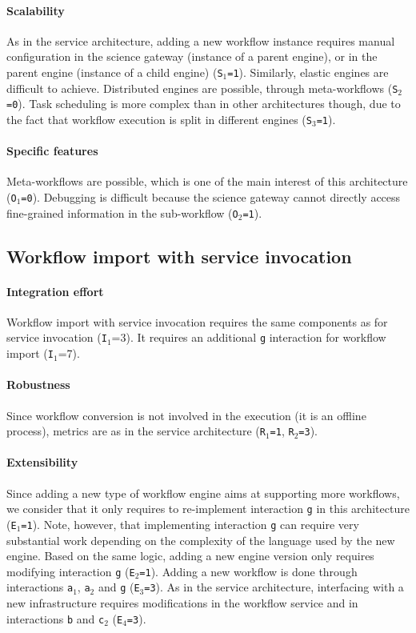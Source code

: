 \documentclass[preprint,3p,twocolumn]{elsarticle}
\begin{document}
\paragraph{Scalability} As in the service architecture, adding a new
workflow instance requires manual configuration in the science gateway
(instance of a parent engine), or in the parent engine (instance of a
child engine) (\texttt{S$_1$=1}). Similarly, elastic engines are
difficult to achieve. Distributed engines are
possible, through meta-workflows (\texttt{S$_2$=0}). Task scheduling
is more complex than in other architectures though, due to the fact
that workflow execution is split in different engines (\texttt{S$_3$=1}).

\paragraph{Specific features}
Meta-workflows are possible, which is one of the main interest of this
architecture (\texttt{O$_1$=0}).  Debugging is difficult because the
science gateway cannot directly access fine-grained information in the
sub-workflow (\texttt{O$_2$=1}).

\subsection{Workflow import with service invocation}

\paragraph{Integration effort} Workflow import with service invocation
requires the same components as for service invocation
(\texttt{I$_1$}=3). It requires an additional \texttt{g} interaction
for workflow import (\texttt{I$_1$}=7).

\paragraph{Robustness} Since workflow conversion is not involved in
the execution (it is an offline process), metrics are as in the
service architecture (\texttt{R$_1$=1}, \texttt{R$_2$=3}).

\paragraph{Extensibility} Since adding a new type of workflow engine
aims at supporting more workflows, we consider that it only requires
to re-implement interaction \texttt{g} in this architecture  (\texttt{E$_1$=1}). Note,
however, that implementing interaction \texttt{g} can require very
substantial work depending on the complexity of the language used by
the new engine. Based on the same logic, adding a
new engine version only requires modifying interaction \texttt{g}
(\texttt{E$_2$=1}).  Adding a new workflow is done through
interactions \texttt{a$_1$}, \texttt{a$_2$} and \texttt{g} (\texttt{E$_3$=3}). As in the
service architecture, interfacing with a new infrastructure requires
modifications in the workflow service and in interactions \texttt{b}
and \texttt{c$_2$} (\texttt{E$_4$=3}).
\end{document}
